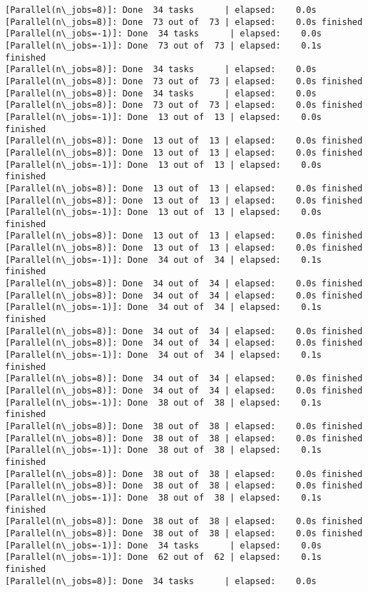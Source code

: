 \documentclass[11pt]{article}
\begin{document}
\begin{Verbatim}[commandchars=\\\{\}]
[Parallel(n\_jobs=8)]: Done  34 tasks      | elapsed:    0.0s
[Parallel(n\_jobs=8)]: Done  73 out of  73 | elapsed:    0.0s finished
[Parallel(n\_jobs=-1)]: Done  34 tasks      | elapsed:    0.0s
[Parallel(n\_jobs=-1)]: Done  73 out of  73 | elapsed:    0.1s finished
[Parallel(n\_jobs=8)]: Done  34 tasks      | elapsed:    0.0s
[Parallel(n\_jobs=8)]: Done  73 out of  73 | elapsed:    0.0s finished
[Parallel(n\_jobs=8)]: Done  34 tasks      | elapsed:    0.0s
[Parallel(n\_jobs=8)]: Done  73 out of  73 | elapsed:    0.0s finished
[Parallel(n\_jobs=-1)]: Done  13 out of  13 | elapsed:    0.0s finished
[Parallel(n\_jobs=8)]: Done  13 out of  13 | elapsed:    0.0s finished
[Parallel(n\_jobs=8)]: Done  13 out of  13 | elapsed:    0.0s finished
[Parallel(n\_jobs=-1)]: Done  13 out of  13 | elapsed:    0.0s finished
[Parallel(n\_jobs=8)]: Done  13 out of  13 | elapsed:    0.0s finished
[Parallel(n\_jobs=8)]: Done  13 out of  13 | elapsed:    0.0s finished
[Parallel(n\_jobs=-1)]: Done  13 out of  13 | elapsed:    0.0s finished
[Parallel(n\_jobs=8)]: Done  13 out of  13 | elapsed:    0.0s finished
[Parallel(n\_jobs=8)]: Done  13 out of  13 | elapsed:    0.0s finished
[Parallel(n\_jobs=-1)]: Done  34 out of  34 | elapsed:    0.1s finished
[Parallel(n\_jobs=8)]: Done  34 out of  34 | elapsed:    0.0s finished
[Parallel(n\_jobs=8)]: Done  34 out of  34 | elapsed:    0.0s finished
[Parallel(n\_jobs=-1)]: Done  34 out of  34 | elapsed:    0.1s finished
[Parallel(n\_jobs=8)]: Done  34 out of  34 | elapsed:    0.0s finished
[Parallel(n\_jobs=8)]: Done  34 out of  34 | elapsed:    0.0s finished
[Parallel(n\_jobs=-1)]: Done  34 out of  34 | elapsed:    0.1s finished
[Parallel(n\_jobs=8)]: Done  34 out of  34 | elapsed:    0.0s finished
[Parallel(n\_jobs=8)]: Done  34 out of  34 | elapsed:    0.0s finished
[Parallel(n\_jobs=-1)]: Done  38 out of  38 | elapsed:    0.1s finished
[Parallel(n\_jobs=8)]: Done  38 out of  38 | elapsed:    0.0s finished
[Parallel(n\_jobs=8)]: Done  38 out of  38 | elapsed:    0.0s finished
[Parallel(n\_jobs=-1)]: Done  38 out of  38 | elapsed:    0.1s finished
[Parallel(n\_jobs=8)]: Done  38 out of  38 | elapsed:    0.0s finished
[Parallel(n\_jobs=8)]: Done  38 out of  38 | elapsed:    0.0s finished
[Parallel(n\_jobs=-1)]: Done  38 out of  38 | elapsed:    0.1s finished
[Parallel(n\_jobs=8)]: Done  38 out of  38 | elapsed:    0.0s finished
[Parallel(n\_jobs=8)]: Done  38 out of  38 | elapsed:    0.0s finished
[Parallel(n\_jobs=-1)]: Done  34 tasks      | elapsed:    0.0s
[Parallel(n\_jobs=-1)]: Done  62 out of  62 | elapsed:    0.1s finished
[Parallel(n\_jobs=8)]: Done  34 tasks      | elapsed:    0.0s

\end{Verbatim}
\end{document}
